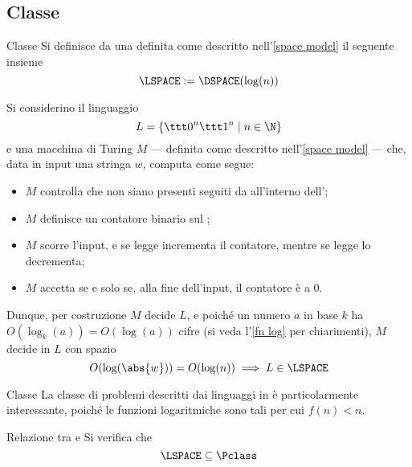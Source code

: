\documentclass[a4paper, 12pt]{report}
\begin{document}
    \subsection{Classe \LSPACE}

    \begin{frameddefn}{Classe \LSPACE}
        Si definisce  da una \TM definita come descritto nell'\cref{space model} il seguente insieme $$\LSPACE := \displaystyle \DSPACE(\log(n))$$
    \end{frameddefn}

    \begin{example}
        Si considerino il linguaggio $$L = \{\ttt 0 ^n \ttt 1 ^n \mid n \in \N\}$$ e una macchina di Turing $M$ --- definita come descritto nell'\cref{space model} --- che, data in input una stringa $w$, computa come segue:

        \begin{itemize}
            \item $M$ controlla che non siano presenti  seguiti da  all'interno dell';
            \item $M$ definisce un contatore binario sul ;
            \item $M$ scorre l'input, e se legge  incrementa il contatore, mentre se legge  lo decrementa;
            \item $M$ accetta se e solo se, alla fine dell'input, il contatore è a 0.
        \end{itemize}

        Dunque, per costruzione $M$ decide $L$, e poiché un numero $a$ in base $k$ ha $O(\log_k(a)) = O(\log(a))$ cifre (si veda l'\cref{fn log} per chiarimenti), $M$ decide in $L$ con spazio $$O(\log(\abs{w})) = O(\log(n)) \implies L \in \LSPACE$$
    \end{example}

    \begin{framedobs}{Classe \LSPACE}
        La classe di problemi descritti dai linguaggi in \LSPACE è particolarmente interessante, poiché le funzioni logaritmiche sono tali per cui $f(n) < n$.
    \end{framedobs}

    \begin{framedprop}{Relazione tra \LSPACE e \Pclass}
        Si verifica che $$\LSPACE \subseteq \Pclass$$
    \end{framedprop}
\end{document}
